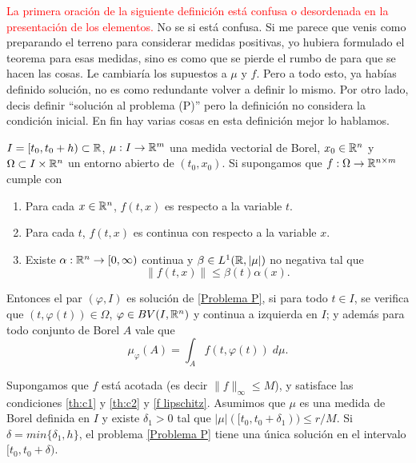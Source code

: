  \textcolor{red}{La primera oración de la siguiente definición está confusa o desordenada en la presentación de los elementos.} {\color{green} No se si está confusa.  Si me parece que venis como preparando el terreno para considerar medidas positivas, yo hubiera formulado el teorema para esas medidas, sino es como que se pierde el rumbo de para que se hacen las cosas. Le cambiaría los supuestos a $\mu$ y $f$. Pero a todo esto, ya habías definido solución, no es como redundante volver a definir lo mismo. Por otro lado, decis definir ``solución al problema (P)'' pero la definición no considera la condición inicial. En fin hay varias cosas en esta definición mejor lo hablamos. }


 
 \begin{defi}\label{def:sol}
  $I=[t_0,t_0+h)\subset \mathbb{R}$, $\mu:I\to \mathbb{R}^m$  una medida vectorial de Borel, $x_0\in \mathbb{R}^n$  y $\Omega\subset I\times\mathbb{R}^n$ un entorno abierto de $(t_0,x_0)$. Si supongamos  que $f:\Omega\to \mathbb{R}^{n\times m}$ cumple con
 	\begin{enumerate}[label=\upshape(\Roman*),ref=(\Roman*)]
 		\item\label{th:c1} Para cada $x\in\mathbb{R}^n$, $f(t,x)$ es  respecto a la variable $t$. 
 		\item\label{th:c2} Para cada $t$, $f(t,x)$ es continua con respecto  a  la variable $x$. 
 		\item\label{th:c3} Existe $\alpha:\mathbb{R}^n\to[0,\infty)$ continua y $\beta\in L^1(\mathbb{R},|\mu|)$ no negativa tal que 
 		$$\left\| f(t,x)\right\|\leq \beta(t)\alpha(x) .$$
 	\end{enumerate}
 	 Entonces el par $(\varphi,I)$ es solución de \eqref{Problema P}, si para todo $t\in I$,  se verifica que $(t,\varphi(t))\in \Omega$,  $\varphi\in BV(I,\mathbb{R}^n)$ y continua a izquierda en $I$; y además para todo conjunto de Borel $A$ vale que 
 	$$\mu_{\varphi}(A)=\int_{A}f(t,\varphi(t))\; d\mu.$$ 
 \end{defi}
















\begin{thm} 
	\label{P-L}
	Supongamos que $f$ está acotada (es decir $\|f\|_{\infty}\leq M$), y satisface las condiciones \ref{th:c1} y \ref{th:c2} y \eqref{f lipschitz}. Asumimos que $\mu$ es una medida de Borel definida en $I$ y existe $\delta_1>0$ tal que  $|\mu|([t_0,t_0+\delta_1))\leq r/M$. Si $\delta=min\{\delta_1, h\}$, el problema \eqref{Problema P} tiene una única solución en el intervalo $[t_0, t_0+\delta)$. \reversemarginpar{}
	
\end{thm}
 
